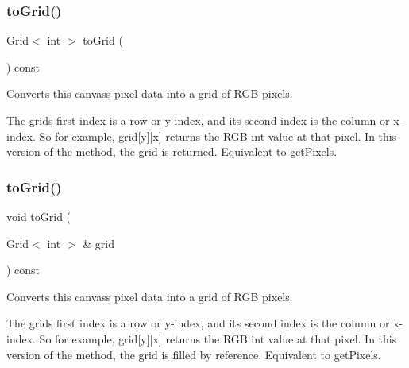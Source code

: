 \subsubsection{\texorpdfstring{to\+Grid()}{toGrid()}\hspace{0.1cm}{\footnotesize\ttfamily [1/2]}}
{\footnotesize\ttfamily Grid$<$ int $>$ to\+Grid (\begin{DoxyParamCaption}{ }\end{DoxyParamCaption}) const\hspace{0.3cm}{\ttfamily [virtual]}}



Converts this canvas\textquotesingle{}s pixel data into a grid of R\+GB pixels. 

The grid\textquotesingle{}s first index is a row or y-\/index, and its second index is the column or x-\/index. So for example, grid\mbox{[}y\mbox{]}\mbox{[}x\mbox{]} returns the R\+GB int value at that pixel. In this version of the method, the grid is returned. Equivalent to get\+Pixels. \mbox{\label{classGCanvas_a11c06bec679dda1519ed914bca68900a}} 
\subsubsection{\texorpdfstring{to\+Grid()}{toGrid()}\hspace{0.1cm}{\footnotesize\ttfamily [2/2]}}
{\footnotesize\ttfamily void to\+Grid (\begin{DoxyParamCaption}\item[{Grid$<$ int $>$ \&}]{grid }\end{DoxyParamCaption}) const\hspace{0.3cm}{\ttfamily [virtual]}}



Converts this canvas\textquotesingle{}s pixel data into a grid of R\+GB pixels. 

The grid\textquotesingle{}s first index is a row or y-\/index, and its second index is the column or x-\/index. So for example, grid\mbox{[}y\mbox{]}\mbox{[}x\mbox{]} returns the R\+GB int value at that pixel. In this version of the method, the grid is filled by reference. Equivalent to get\+Pixels. \mbox{\label{classGObservable_a1fe5121d6528fdea3f243321b3fa3a49}} 
